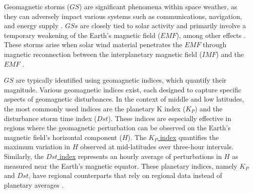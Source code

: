 \documentclass[a4paper,fleqn]{cas-dc}
\begin{document}



Geomagnetic storms ($GS$) are significant phenomena within space weather, as they can adversely impact various systems such as communications, navigation, and energy supply \citep{schrijver2015}. $GSs$ are closely tied to solar activity and primarily involve a temporary weakening of the Earth's magnetic field ($EMF$), among other effects \citep{gonzalestgm}. These storms arise when solar wind material penetrates the $EMF$ through magnetic reconnection between the interplanetary magnetic field ($IMF$) and the $EMF$ \citep[see][and references there in]{l_basic_spaceplasmaphysic, l_russell}.

$GS$ are typically identified using geomagnetic indices, which quantify their magnitude. Various geomagnetic indices exist, each designed to capture specific aspects of geomagnetic disturbances. In the context of middle and low latitudes, the most commonly used indices are the planetary K index (${K_P}$) and the disturbance storm time index (${Dst}$). These indices are especially effective in regions where the geomagnetic perturbation can be observed on the Earth's magnetic field's horizontal component ($H$). The \href{https://www.gfz-potsdam.de/en/section/geomagnetism/data-products-services/geomagnetic-kp-index}{${K_P}$ index} quantifies the maximum variation in $H$ observed at mid-latitudes over three-hour intervals. Similarly, the \href{https://wdc.kugi.kyoto-u.ac.jp/dstae/index.html}{${Dst}$ index} represents an hourly average of perturbations in $H$ as measured near the Earth's magnetic equator. These planetary indices, namely ${K_P}$ and ${Dst}$, have regional counterparts that rely on regional data instead of planetary averages \citep{mayaud1980}.
\end{document}
